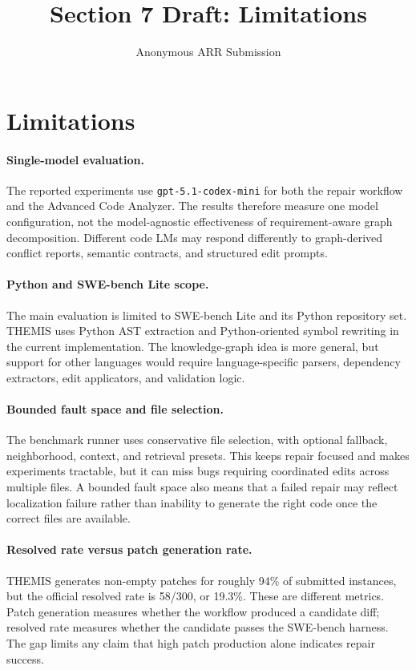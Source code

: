 \documentclass[11pt]{article}
\title{Section 7 Draft: Limitations}
\author{Anonymous ARR Submission}
\begin{document}
\maketitle

\section{Limitations}
\label{sec:limitations}

\paragraph{Single-model evaluation.}
The reported experiments use \texttt{gpt-5.1-codex-mini} for both the repair workflow and the Advanced Code Analyzer.  The results therefore measure one model configuration, not the model-agnostic effectiveness of requirement-aware graph decomposition.  Different code LMs may respond differently to graph-derived conflict reports, semantic contracts, and structured edit prompts.

\paragraph{Python and SWE-bench Lite scope.}
The main evaluation is limited to SWE-bench Lite and its Python repository set.  THEMIS uses Python AST extraction and Python-oriented symbol rewriting in the current implementation.  The knowledge-graph idea is more general, but support for other languages would require language-specific parsers, dependency extractors, edit applicators, and validation logic.

\paragraph{Bounded fault space and file selection.}
The benchmark runner uses conservative file selection, with optional fallback, neighborhood, context, and retrieval presets.  This keeps repair focused and makes experiments tractable, but it can miss bugs requiring coordinated edits across multiple files.  A bounded fault space also means that a failed repair may reflect localization failure rather than inability to generate the right code once the correct files are available.

\paragraph{Resolved rate versus patch generation rate.}
THEMIS generates non-empty patches for roughly 94\% of submitted instances, but the official resolved rate is 58/300, or 19.3\%.  These are different metrics.  Patch generation measures whether the workflow produced a candidate diff; resolved rate measures whether the candidate passes the SWE-bench harness.  The gap limits any claim that high patch production alone indicates repair success.
\end{document}

